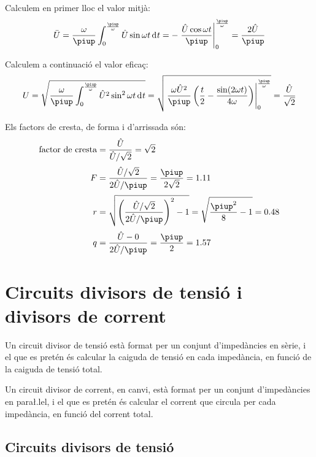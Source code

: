 \begin{exemple}
 Calculem en primer lloc el valor mitj\`{a}:
\[
\bar{U} = \frac{\omega}{\piup} \int_0^\frac{\piup}{\omega} \hat{U}
\sin\omega t \diff t  = - \left. \frac{\hat{U} \cos\omega t}{\piup}
\right|_0^\frac{\piup}{\omega} = \frac{2 \hat{U}}{\piup}
\]

Calculem a continuaci\'{o} el valor efica\c{c}:
\[
U = \sqrt{\frac{\omega}{\piup} \int_0^\frac{\piup}{\omega} \hat{U}^2
\sin^2\omega t \diff t } =   \sqrt{\left.\frac{\omega
\hat{U}^2}{\piup}\left( \frac{t}{2} - \frac{\sin (2\omega t)}{4\omega}
\right)\right|_0^\frac{\piup}{\omega}}  = \frac{\hat{U}}{\sqrt{2}}
\]

Els factors de cresta, de forma i d'arrissada s\'{o}n:
\begin{align*}
    \text{factor de cresta} &= \frac{\hat{U}}{\hat{U}/\sqrt{2}} = \sqrt{2} \\[0.5ex]
    F &= \frac{\hat{U}/\sqrt{2}}{2 \hat{U}/\piup} =\frac{\piup}{2\sqrt{2}} =
    \num{1,11} \\[0.5ex]
r &= \sqrt{\left(\frac{\hat{U}/\sqrt{2}}{2 \hat{U}/\piup}\right)^2-1}
= \sqrt{\frac{\piup^2}{8}-1} = \num{0,48}\\[0.5ex]
q &=  \frac{\hat{U} - 0}{2 \hat{U}/\piup} = \frac{\piup}{2} = \num{1,57}
\end{align*}

\end{exemple}


\section{Circuits divisors de tensi\'{o} i divisors de corrent}\label{sec:div_tens_corr}

Un circuit divisor de tensi\'{o} est\`{a} format per un conjunt
d'imped\`{a}ncies en s\`{e}rie, i el que es pret\'{e}n \'{e}s calcular la caiguda de
tensi\'{o} en cada imped\`{a}ncia, en funci\'{o} de la caiguda de tensi\'{o} total.

Un circuit divisor de corrent, en canvi, est\`{a} format per un conjunt
d'imped\`{a}ncies en para{\l.l}el, i el que es pret\'{e}n \'{e}s calcular el
corrent que circula per cada imped\`{a}ncia, en funci\'{o} del corrent
total.

\subsection{Circuits divisors de tensi\'{o}}

